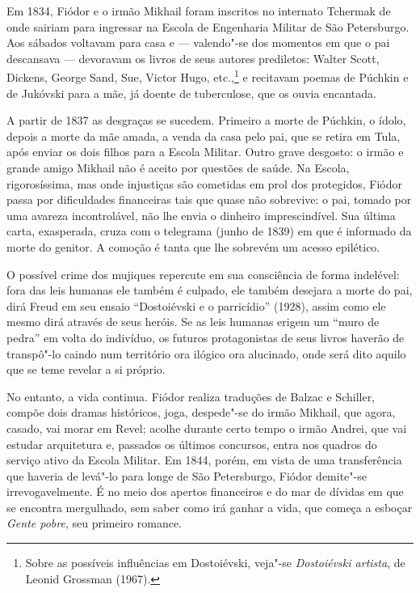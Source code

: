 Em 1834, Fiódor e o irmão Mikhail foram inscritos no internato Tchermak
de onde sairiam para ingressar na Escola de Engenharia Militar
de São Petersburgo. Aos sábados voltavam para casa e --- valendo"-se dos momentos em que o pai descansava --- devoravam os livros de seus autores prediletos: Walter Scott, Dickens, George Sand, Sue, Victor Hugo, etc.,\footnote{Sobre as possíveis influências em Dostoiévski, veja"-se \emph{Dostoiévski artista}, de Leonid Grossman (1967).} e recitavam poemas de Púchkin e
de Jukóvski para a mãe, já doente de tuberculose, que os ouvia
encantada.

A partir de 1837 as desgraças se sucedem. Primeiro a morte de
Púchkin, o ídolo, depois a morte da mãe amada, a venda da casa
pelo pai, que se retira em Tula, após enviar os dois filhos para
a Escola Militar. Outro grave desgosto: o irmão e grande amigo
Mikhail não é aceito por questões de saúde. Na Escola,
rigorosíssima, mas onde injustiças são cometidas em prol dos
protegidos, Fiódor passa por dificuldades financeiras tais que
quase não sobrevive: o pai, tomado por uma avareza incontrolável,
não lhe envia o dinheiro imprescindível. Sua última carta,
exasperada, cruza com o telegrama (junho de 1839) em que é
informado da morte do genitor. A comoção é tanta que lhe
sobrevém um acesso epilético.

O possível crime dos mujiques repercute em sua consciência de
forma indelével: fora das leis humanas ele também é culpado, ele
também desejara a morte do pai, dirá Freud em seu ensaio
``Dostoiévski e o parricídio'' (1928), assim como ele mesmo
dirá através de seus heróis. Se as leis humanas erigem um
``muro de pedra'' em volta do indivíduo, os futuros protagonistas
de seus livros haverão de transpô"-lo caindo num território ora
ilógico ora alucinado, onde será dito aquilo que se teme revelar
a si próprio.

No entanto, a vida continua. Fiódor realiza traduções de Balzac
e Schiller, compõe dois dramas históricos, joga, despede"-se do
irmão Mikhail, que agora, casado, vai morar em Revel; acolhe
durante certo tempo o irmão Andrei, que vai estudar arquitetura
e, passados os últimos concursos, entra nos quadros do serviço
ativo da Escola Militar. Em 1844, porém, em vista de uma
transferência que haveria de levá"-lo para longe de São
Petersburgo, Fiódor demite"-se irrevogavelmente. É no meio dos apertos
financeiros e do mar de dívidas em que se encontra mergulhado, sem saber
como irá ganhar a vida, que começa a esboçar \emph{Gente
pobre}, seu primeiro romance.

